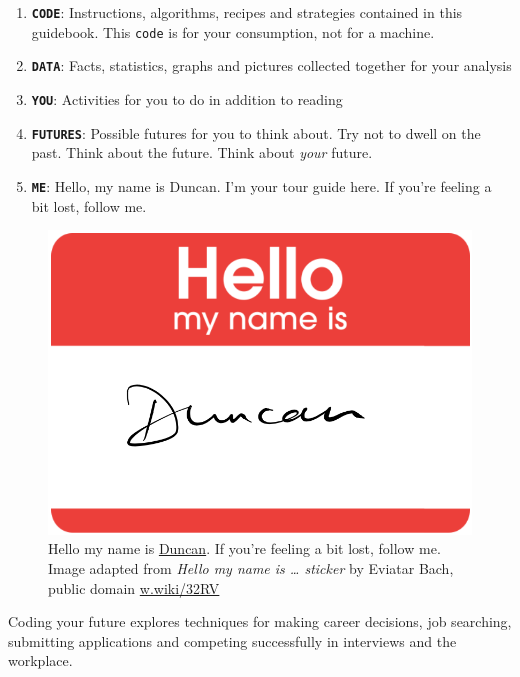 \documentclass[
]{book}
\providecommand{\tightlist}{%
  \setlength{\itemsep}{0pt}\setlength{\parskip}{0pt}}
\begin{document}
\begin{enumerate}
\def\labelenumi{\arabic{enumi}.}
\tightlist
\item
  \textbf{\texttt{CODE}}: Instructions, algorithms, recipes and strategies contained in this guidebook. This \texttt{code} is for your consumption, not for a machine.
\item
  \textbf{\texttt{DATA}}: Facts, statistics, graphs and pictures collected together for your analysis
\item
  \textbf{\texttt{YOU}}: Activities for you to do in addition to reading
\item
  \textbf{\texttt{FUTURES}}: Possible futures for you to think about. Try not to dwell on the past. Think about the future. Think about \emph{your} future. \citep{thinkaboutthefuture, wroteforluck}
\item
  \textbf{\texttt{ME}}: Hello, my name is Duncan. I'm your tour guide here. If you're feeling a bit lost, follow me.
\end{enumerate}

\begin{figure}

{\centering \includegraphics[width=0.69\linewidth]{images/Hello-my-name-is-Duncan} 

}

\caption{Hello my name is \href{https://en.wikipedia.org/wiki/Duncan_(given_name)}{Duncan}. If you're feeling a bit lost, follow me. Image adapted from \emph{Hello my name is \ldots{} sticker} by Eviatar Bach, public domain \href{https://w.wiki/32RV}{w.wiki/32RV}}\label{fig:hello-my-name-fig}
\end{figure}



Coding your future explores techniques for making career decisions, job searching, submitting applications and competing successfully in interviews and the workplace.
\end{document}
